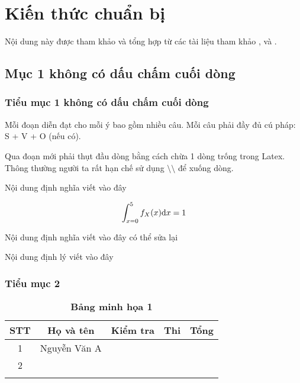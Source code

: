 \chapter{Kiến thức chuẩn bị}
\setcounter{page}{1}
Nội dung này được tham khảo và tổng hợp từ các tài liệu tham khảo \cite{1}, \cite{2} và \cite{5}. 


\section{Mục 1 không có dấu chấm cuối dòng}
\subsection{Tiểu mục 1 không có dấu chấm cuối dòng}

Mỗi đoạn diễn đạt cho mỗi ý bao gồm nhiều câu. Mỗi câu phải đầy đủ cú pháp: S + V + O (nếu có).

Qua đoạn mới phải thụt đầu dòng bằng cách chừa 1 dòng trống trong Latex. Thông thường người ta rất hạn chế sử dụng $\setminus\setminus$ để xuống dòng. 
\begin{dn}
 Nội dung định nghĩa viết vào đây
\end{dn}

\[ \int_{x=0}^5 f_X (x) {\rm d}x=1 \]

\begin{dn}
 Nội dung định nghĩa viết vào đây có thể sửa lại
\end{dn}

\begin{dl}
 Nội dung định lý viết vào đây   
\end{dl}


\subsection{Tiểu mục 2}

\begin{table}[ht]
 \caption{\textbf{Bảng minh họa 1}}
    \centering
    \begin{tabular}{|c|c|c|c|c|}
    \hline
     STT    & Họ và tên & Kiểm tra & Thi & Tổng\\
      \hline
     1    & Nguyễn Văn A &  &  & \\
      \hline
      2   &  &  &  & \\
       \hline
         &  &  &  & \\
       \hline
    \end{tabular} 
\end{table}

